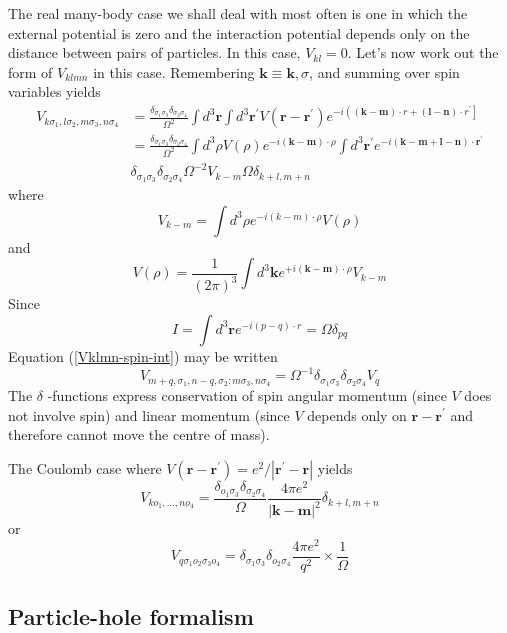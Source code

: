 The real many-body case we shall deal with most often is one in which the external potential is zero and the interaction potential depends only on the distance between pairs of particles. In this case, $V_{kl}=0$. Let's now work out the form of $V_{klmn}$ in this case. Remembering $\mathbf{k}\equiv\mathbf{k},\sigma$, and summing over spin variables yields
\begin{equation}\begin{aligned}
V_{k \sigma_{1}, l \sigma_{2}, m \sigma_{3}, n \sigma_{4}} &=\frac{\delta_{\sigma_{1}\sigma_3}  \delta_{\sigma_{2} \sigma_{4}}}{\Omega^{2}} \int d^{3} \mathbf{r} \int d^{3} \mathbf{r}^{\prime} V\left(\mathbf{r}-\mathbf{r}^{\prime}\right) e^{-i\left((\mathbf{k}-\mathbf{m}) \cdot r+(\mathbf{l}-\mathbf{n}) \cdot r^{\prime}\right]} \\
&=\frac{\delta_{\sigma_{1} \sigma_{3}} \delta_{\sigma_{2} \sigma_{4}}}{\Omega^{2}} \int d^{3} \rho V(\rho) e^{-i(\mathbf{k}-\mathbf{m}) \cdot \rho} \int d^{3} \mathbf{r}^{\prime} e^{-i(\mathbf{k}-\mathbf{m}+\mathbf{l}-\mathbf{n}) \cdot \mathbf{r}^{\prime}}\\
&\delta_{\sigma_{1} \sigma_{3}} \delta_{\sigma_{2} \sigma_{4}} \Omega^{-2} V_{k-m} \Omega \delta_{k+l, m+n}
\end{aligned}
\label{Vklmn-spin-int}
\end{equation}
where
\begin{equation}V_{k-m}=\int d^{3} \rho e^{-i(k-m) \cdot \rho} V(\rho)\end{equation}
and
\begin{equation}V(\rho)=\frac{1}{(2 \pi)^{3}} \int d^{3} \mathbf{k} e^{+i(\mathbf{k}-\mathbf{m}) \cdot \rho} V_{k-m}\end{equation}
Since
$$I=\int d^{3} \mathbf{r} e^{-i(p-q) \cdot r}=\Omega \delta_{p q}$$
Equation (\ref{Vklmn-spin-int}) may be written
$$V_{m+q, \sigma_{1}, n-q, \sigma_{2}: m \sigma_{3}, n \sigma_{4}}=\Omega^{-1} \delta_{\sigma_{1} \sigma_{3}} \delta_{\sigma_{2} \sigma_{4}} V_{q}$$
The $\delta$ -functions express conservation of spin angular momentum (since $V$ does not involve spin) and linear momentum (since $V$ depends only on $\mathbf{r}-\mathbf{r}^{\prime}$ and therefore cannot move the centre of mass). 
\begin{mybox}
The Coulomb case where $V\left(\mathbf{r}-\mathbf{r}^{\prime}\right)=e^{2} /\left|\mathbf{r}^{\prime}-\mathbf{r}\right|$ yields
$$V_{k o_{1}, \ldots, n o_{4}}=\frac{\delta_{o_{1} \sigma_{3}} \delta_{\sigma_{2} \sigma_{4}}}{\Omega} \frac{4 \pi e^{2}}{|\mathbf{k}-\mathbf{m}|^{2}} \delta_{k+l, m+n}$$
or
$$V_{q \sigma_{1} o_{2} \sigma_{3} o_{4}}=\delta_{\sigma_{1} \sigma_{3}} \delta_{o_{2} \sigma_{4}} \frac{4 \pi e^{2}}{q^{2}} \times \frac{1}{\Omega}$$
\end{mybox}

\subsection{Particle-hole formalism}
